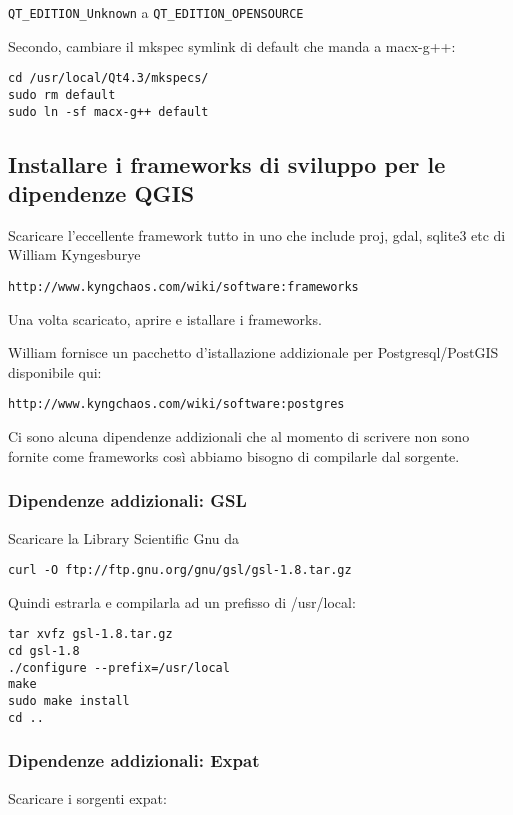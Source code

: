 \texttt{QT\_EDITION\_Unknown} a \texttt{QT\_EDITION\_OPENSOURCE}

Secondo, cambiare il mkspec symlink di default che manda a macx-g++:

\begin{verbatim}
cd /usr/local/Qt4.3/mkspecs/ 
sudo rm default 
sudo ln -sf macx-g++ default
\end{verbatim}

\subsection{Installare i frameworks di sviluppo per le dipendenze QGIS}
Scaricare l'eccellente framework tutto in uno che include proj, gdal, sqlite3 etc di William Kyngesburye

\begin{verbatim}
http://www.kyngchaos.com/wiki/software:frameworks
\end{verbatim}

Una volta scaricato, aprire e istallare i frameworks.

William fornisce un pacchetto d'istallazione addizionale per Postgresql/PostGIS disponibile qui:

\begin{verbatim}
http://www.kyngchaos.com/wiki/software:postgres 
\end{verbatim}

Ci sono alcuna dipendenze addizionali che al momento di scrivere non sono fornite come frameworks così abbiamo bisogno di compilarle dal sorgente.

\subsubsection{Dipendenze addizionali: GSL}
Scaricare la Library Scientific Gnu da

\begin{verbatim}
curl -O ftp://ftp.gnu.org/gnu/gsl/gsl-1.8.tar.gz 
\end{verbatim}

Quindi estrarla e compilarla ad un prefisso di /usr/local:

\begin{verbatim}
tar xvfz gsl-1.8.tar.gz 
cd gsl-1.8 
./configure --prefix=/usr/local 
make
sudo make install
cd ..  
\end{verbatim}

\subsubsection{Dipendenze addizionali: Expat}
Scaricare i sorgenti expat:

